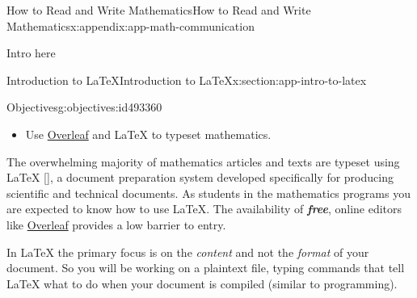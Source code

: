 \documentclass[oneside,10pt,]{book}
\newcommand{\xreffont}{\relax}
\newcommand{\alert}[1]{\textbf{\textit{#1}}}
\numberwithin{equation}{section}
\newenvironment{codedisplay}
{\VerbatimEnvironment\begin{center}\begin{lrbox}{\codedisplaybox}\begin{BVerbatim}}
{\end{BVerbatim}\end{lrbox}\usebox{\codedisplaybox}\end{center}}
\begin{document}
\begin{appendixptx}{How to Read and Write Mathematics}{}{How to Read and Write Mathematics}{}{}{x:appendix:app-math-communication}
\begin{introduction}{}%
Intro here%
\end{introduction}%
%
%
\typeout{************************************************}
\typeout{************************************************}
%
\begin{sectionptx}{Introduction to \LaTeX{}}{}{Introduction to \LaTeX{}}{}{}{x:section:app-intro-to-latex}
\begin{objectives}{Objectives}{g:objectives:id493360}
%
\begin{itemize}[label=\textbullet]
\item{}Use \href{https://www.overleaf.com/}{Overleaf} and \LaTeX{} to typeset mathematics.%
\end{itemize}
\end{objectives}
The overwhelming majority of mathematics articles and texts are typeset using \LaTeX{} \hyperlink{x:biblio:bib-latex}{[{\xreffont 7}]}, a document preparation system developed specifically for producing scientific and technical documents. As students in the mathematics programs you are expected to know how to use \LaTeX{}. The availability of \alert{free}, online editors like \href{https://www.overleaf.com/}{Overleaf} provides a low barrier to entry.%
\par
In \LaTeX{} the primary focus is on the \emph{content} and not the \emph{format} of your document. So you will be working on a plaintext file, typing commands that tell \LaTeX{} what to do when your document is compiled (similar to programming).%
\end{sectionptx}
\end{appendixptx}
\end{document}
